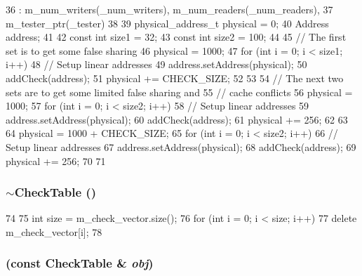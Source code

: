 \begin{DoxyCode}
36     : m_num_writers(_num_writers), m_num_readers(_num_readers),
37       m_tester_ptr(_tester)
38 {
39     physical_address_t physical = 0;
40     Address address;
41 
42     const int size1 = 32;
43     const int size2 = 100;
44 
45     // The first set is to get some false sharing
46     physical = 1000;
47     for (int i = 0; i < size1; i++) {
48         // Setup linear addresses
49         address.setAddress(physical);
50         addCheck(address);
51         physical += CHECK_SIZE;
52     }
53 
54     // The next two sets are to get some limited false sharing and
55     // cache conflicts
56     physical = 1000;
57     for (int i = 0; i < size2; i++) {
58         // Setup linear addresses
59         address.setAddress(physical);
60         addCheck(address);
61         physical += 256;
62     }
63 
64     physical = 1000 + CHECK_SIZE;
65     for (int i = 0; i < size2; i++) {
66         // Setup linear addresses
67         address.setAddress(physical);
68         addCheck(address);
69         physical += 256;
70     }
71 }
\end{DoxyCode}
\hypertarget{classCheckTable_a20cfee885e35bdf6c3f8e5d3706336e2}{
\subsubsection[{$\sim$CheckTable}]{\setlength{\rightskip}{0pt plus 5cm}$\sim${\bf CheckTable} ()}}
\label{classCheckTable_a20cfee885e35bdf6c3f8e5d3706336e2}



\begin{DoxyCode}
74 {
75     int size = m_check_vector.size();
76     for (int i = 0; i < size; i++)
77         delete m_check_vector[i];
78 }
\end{DoxyCode}
\hypertarget{classCheckTable_a49ff58d7c5aa9ffaebf3c47b54df261d}{
\subsubsection[{CheckTable}]{ (const {\bf CheckTable} \& {\em obj})}}
\label{classCheckTable_a49ff58d7c5aa9ffaebf3c47b54df261d}


